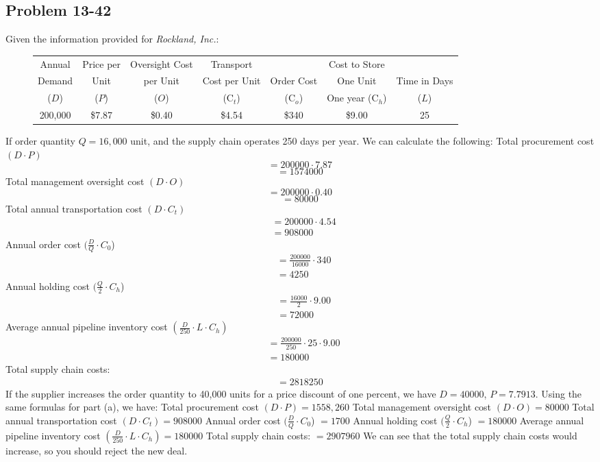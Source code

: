 \documentclass[letterpaper, 11pt]{article}
\newcommand{\1}{\mathds{1}}	%
\theoremstyle{definition}
\begin{document}
\subsection*{Problem 13-42}
Given the information provided for \textit{Rockland, Inc.}:
\begin{figure}[H]
\centering
    \begin{tabular}{ccccccc}
        \toprule
        Annual & Price per & Oversight Cost & Transport &  & Cost to Store \\
        Demand & Unit & per Unit  & Cost per Unit  & Order Cost  & One Unit  & Time in Days  \\
        ($D$) & ($P$) & ($O$) &(C$_t$) &(C$_o$) & One year (C$_h$) & ($L$) \\
        \midrule
        200,000 & \$7.87 & \$0.40 & \$4.54 & \$340 & \$9.00 & 25 \\
        \bottomrule
    \end{tabular}
\end{figure} \noindent 
If order quantity $Q = 16,000$ unit, and the supply chain operates 250 days per year. We can calculate the following: \bigbreak \noindent
Total procurement cost
$(D \cdot P)$
$$ = 200000 \cdot 7.87$$
$$ = 1574000$$
Total management oversight cost $(D \cdot O)$
$$ = 200000 \cdot 0.40$$
$$ = 80000$$
Total annual transportation cost $(D \cdot C_t)$
\begin{align*}
& = 200000  \cdot 4.54 \\
& = 908000 
\end{align*}
Annual order cost $(\frac{D}{Q} \cdot C_0$)
\begin{align*}
& = \frac{200000}{16000} \cdot 340 \\
& = 4250
\end{align*}
Annual holding cost $(\frac{Q}{2}\cdot C_h$)
\begin{align*}
    & = \frac{16000}{2} \cdot 9.00 \\
    & = 72000
\end{align*}
Average annual pipeline inventory cost $(\frac{D}{250} \cdot L \cdot C_h)$
\begin{align*}
& = \frac{200000}{250} \cdot 25 \cdot 9.00   \\
& = 180000
\end{align*}
\bigbreak \noindent
Total supply chain costs:
\begin{align*}
    = 2818250
\end{align*}
If the supplier increases the order quantity to 40,000 units for a price discount of one percent, we have $D = 40000$, $P = 7.7913$.
Using the same formulas for part (a), we have:
\bigbreak \noindent
Total procurement cost $(D \cdot P) = 1558,260$
\bigbreak \noindent
Total management oversight cost $(D \cdot O) = 80000$
\bigbreak \noindent
Total annual transportation cost $(D \cdot C_t) = 908000$
\bigbreak \noindent
Annual order cost $(\frac{D}{Q} \cdot C_0$) $ = 1700$
\bigbreak \noindent
Annual holding cost $(\frac{Q}{2}\cdot C_h$) $ = 180000$
\bigbreak \noindent
Average annual pipeline inventory cost $(\frac{D}{250} \cdot L \cdot C_h) = 180000$
\bigbreak \noindent
Total supply chain costs: $ = 2907960$ 
\bigbreak \noindent
We can see that the total supply chain costs would increase, so you should reject the new deal.
\end{document}
